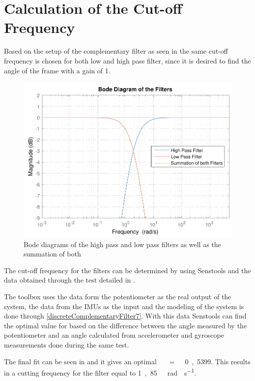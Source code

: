 \section{Calculation of the Cut-off Frequency}
Based on the setup of the complementary filter as seen in  the same cut-off frequency is chosen for both low and high pass filter, since it is desired to find the angle of the frame with a gain of 1.
%
\begin{figure}[H]
	\centering
	\includegraphics[scale=0.7]{figures/bodeFilters}
	\caption{Bode diagrams of the high pass and low pass filters as well as the summation of both}
	\label{bodeFilters}
\end{figure}\vspace{-5mm}
%
The cut-off frequency for the filters can be determined by using Senstools and the data obtained through the test detailed in .

The toolbox uses the data form the potentiometer as the real output of the system, the data from the IMUs as the input and the modeling of the system is done through \eqref{discreteComplementaryFilter7}. With this data Senstools can find the optimal value for \si{\tau} based on the difference between the angle measured by the potentiometer and an angle calculated from accelerometer and gyroscope measurements done during the same test.

The final fit can be seen in  and it gives an optimal \si{\tau\ =\ 0,5399}. This results in a cutting frequency for the filter equal to \si{1,85\ rad \cdot s^{-1}}.

